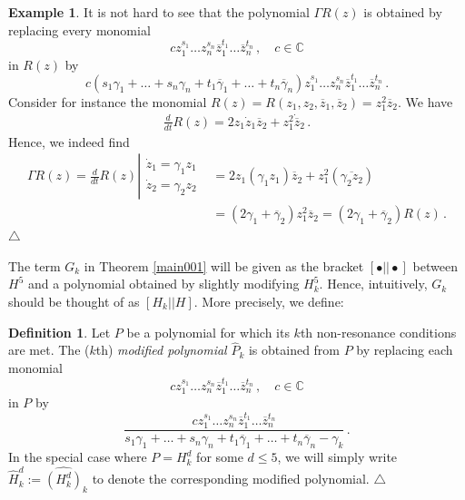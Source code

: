 \documentclass[12pt]{article}
\theoremstyle{plain}
\theoremstyle{definition}
\newtheorem{defi}[thr]{Definition}
\newtheorem{ex}[thr]{Example}
\theoremstyle{remark}
\theoremstyle{remark}
\begin{document}
\begin{ex}\label{exgamma}
It is not hard to see that the polynomial $\Gamma R(z)$ is obtained by replacing every monomial 
\[c z_1^{s_1}\dots  z_n^{s_n} \overline{z}_1^{t_1}  \dots  \overline{z}_n^{t_n}\, ,\quad c \in \mathbb{C}\] 
in $R(z)$ by
\[c(s_1\gamma_1 +\dots + s_n\gamma_n + t_1\overline{\gamma}_1 + \dots + t_n\overline{\gamma}_n)z_1^{s_1}\dots  z_n^{s_n} \overline{z}_1^{t_1}  \dots  \overline{z}_n^{t_n}\, .\]
Consider for instance the monomial  $R(z) = R(z_1, z_2,\overline{z}_1, \overline{z}_2) = z_1^2\overline{z}_2$. We have
\begin{align}
\frac{d}{dt}R(z) = 2z_1\dot{z}_1\overline{z}_2 + z_1^2\dot{\overline{z}}_2  \, .
\end{align}
Hence, we indeed find
 \begin{align}
\Gamma R(z) = \frac{d}{dt}R(z)\left|{\begin{array}{l}
  \dot{z}_1 =  \gamma_1z_1 \\
   \dot{z}_2 =  \gamma_2z_2
\end{array}}\right. &= 2z_1(\gamma_1z_1)\overline{z}_2 + z_1^2(\overline{\gamma_2z_2}) \\ \nonumber
&= (2\gamma_1 + \overline{\gamma}_2)z_1^2\overline{z}_2 =(2\gamma_1 + \overline{\gamma}_2)R(z)\, .
\end{align}\hfill $\triangle$
\end{ex}

The term $G_k$ in Theorem \ref{main001} will be given as the bracket $[\bullet || \bullet]$ between ${H}^5$ and a polynomial obtained by slightly modifying ${H}^5_k$. Hence, intuitively,  $G_k$ should be thought of as $[H_k|| H]$. More precisely, we define:

\begin{defi}\label{augmentedd}
Let $P$ be a polynomial for which its $k$th non-resonance conditions are met. The ($k$th) \emph{modified polynomial} $\widehat{P}_{k}$ is obtained from $P$ by replacing each monomial 
\[c z_1^{s_1}\dots  z_n^{s_n} \overline{z}_1^{t_1}  \dots  \overline{z}_n^{t_n}\, ,\quad c \in \mathbb{C}\] 
in $P$ by
\[\frac{cz_1^{s_1}\dots  z_n^{s_n} \overline{z}_1^{t_1}  \dots  \overline{z}_n^{t_n}}{s_1\gamma_1 +\dots + s_n\gamma_n + t_1\overline{\gamma}_1 + \dots + t_n\overline{\gamma}_n - \gamma_k}\, .\]
In the special case where $P = {H}^d_k$ for some $d \leq 5$, we will simply write $\widehat{H}^d_{k} := \widehat{(H^d_k)}_{k}$ to denote the corresponding modified polynomial. \hfill $\triangle$
\end{defi}
\end{document}
